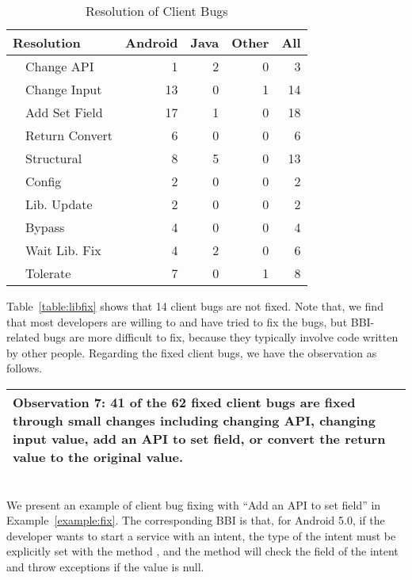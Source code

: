\begin{table}
	\center
	\caption{\label{table:clifix} Resolution of Client Bugs}
	\begin{tabular}{|l|l|r|r|r|r|}
		\hline
		\multicolumn{2}{|l|}{Resolution} & Android & Java & Other & All\\
		\hline
		\NameEntry{8}{Fixed}& Change API & 1   &  2 &   0  &  3  \\
		& Change Input& 13  & 0   &  1  & 14 \\
		& Add Set Field& 17   & 1   &   0  &  18  \\
		& Return Convert& 6  & 0   &  0  &  6  \\
		& Structural&  8 &   5 &   0  &  13  \\
		& Config&    2 &   0 &  0  & 2   \\
		& Lib. Update&  2   &  0  &  0     &  2  \\ 
		& Bypass&   4  &  0  & 0  &  4  \\ 
		
		\hline
		\NameEntry{2}{Not Fixed}& Wait Lib. Fix& 4  & 2 &  0  & 6  \\         
		& Tolerate  & 7  & 0 &  1  &  8 \\		
		\hline 
	\end{tabular}	
	\vspace{+0.3cm}		
\end{table}

Table~\ref{table:libfix} shows that 14 client bugs are not fixed. Note that, we find that most developers are willing to and have tried to fix the bugs, but BBI-related bugs are more difficult to fix, because they typically involve code written by other people. Regarding the fixed client bugs, we have the observation as follows. \\


\noindent\begin{tabular}{|p{16cm}|}
	\hline
	\textbf{Observation 7:} 41 of the 62 fixed client bugs are fixed through small changes including changing API, changing input value, add an API to set field, or convert the return value to the original value. \\
	\hline
\end{tabular}
\\

We present an example of client bug fixing with ``Add an API to set field'' in Example~\ref{example:fix}. The corresponding BBI is that, for Android 5.0, if the developer wants to start a service with an intent, the type of the intent must be explicitly set with the method , and the method  will check the  field of the intent and throw exceptions if the value is null. %

